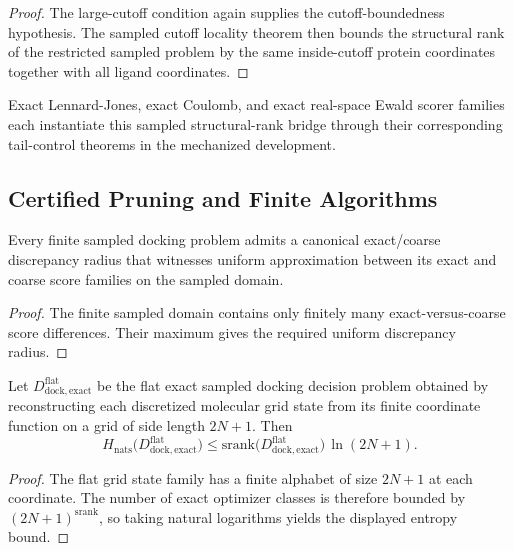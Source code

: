 \begin{proof}
The large-cutoff condition again supplies the cutoff-boundedness hypothesis. The sampled cutoff locality theorem then bounds the structural rank of the restricted sampled problem by the same inside-cutoff protein coordinates together with all ligand coordinates.
\end{proof}

Exact Lennard-Jones, exact Coulomb, and exact real-space Ewald scorer families each instantiate this sampled structural-rank bridge through their corresponding tail-control theorems in the mechanized development.

\subsection{Certified Pruning and Finite Algorithms}

\begin{theorem}\label{thm:finite-uniform-error-radius}
Every finite sampled docking problem admits a canonical exact/coarse discrepancy radius that witnesses uniform approximation between its exact and coarse score families on the sampled domain.
\end{theorem}

\begin{proof}
The finite sampled domain contains only finitely many exact-versus-coarse score differences. Their maximum gives the required uniform discrepancy radius.
\end{proof}

\begin{theorem}\label{thm:grid-docking-entropy}
Let $D^{\mathrm{flat}}_{\mathrm{dock,exact}}$ be the flat exact sampled docking decision problem obtained by reconstructing each discretized molecular grid state from its finite coordinate function on a grid of side length $2N+1$. Then
\[
H_{\mathrm{nats}}\!\bigl(D^{\mathrm{flat}}_{\mathrm{dock,exact}}\bigr)
\le
\mathrm{srank}\!\bigl(D^{\mathrm{flat}}_{\mathrm{dock,exact}}\bigr)\,\ln(2N+1).
\]
\end{theorem}

\begin{proof}
The flat grid state family has a finite alphabet of size $2N+1$ at each coordinate. The number of exact optimizer classes is therefore bounded by $(2N+1)^{\mathrm{srank}}$, so taking natural logarithms yields the displayed entropy bound.
\end{proof}

